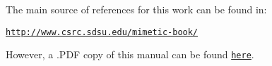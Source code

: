 The main source of references for this work can be found in\+:

\href{http://www.csrc.sdsu.edu/mimetic-book/}{\tt http\+://www.\+csrc.\+sdsu.\+edu/mimetic-\/book/}

However, a .P\+D\+F copy of this manual can be found \href{../latex/refman.pdf}{\tt here}. 